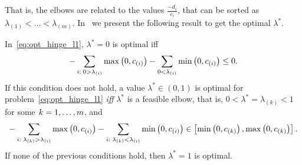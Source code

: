 That is, the elbows are related to the values $\frac{-d_i}{c_i}$, that can be sorted as ${\lambda}_{(1)} < \ldots < {\lambda}_{(m)}$.
In~\citet[Proposition 2]{RuizAD21} we present the following result to get the optimal $\lambda^*$.
\begin{proposition}\label{prop:hinge_neurocom2020}
    In~\eqref{eq:opt_hinge_l1}, $\lambda^*=0$ is optimal iff
    \begin{equation}
        \nonumber
        -\sum_{i:\; 0 > \lambda_{(i)}} \max\left(0, c_{(i)}\right) - \sum_{0 < \lambda_{(i)}} \min\left(0, c_{(i)}\right) \leq 0 .
        \end{equation}
        If this condition does not hold, a value $\lambda^* \in (0, 1)$ is optimal for problem~\eqref{eq:opt_hinge_l1} \emph{iff} $\lambda^*$ is a feasible elbow, that is, $0 < \lambda^* = \lambda_{(k)} < 1$ for some $k=1, \dotsc, m$, and
    \begin{equation}
        \label{eq:sol_hinge}
        -\sum_{i:\; \lambda_{(k)} > \lambda_{(i)}} \mymax{0, c_{(i)}} - \sum_{i:\; \lambda_{(k)} <\lambda_{(i)}} \mymin{0, c_{(i)}} \in \left[\mymin{0, c_{(k)}}, \mymax{0, c_{(k)}} \right] .
    \end{equation}
    If none of the previous conditions hold, then $\lambda^*=1$ is optimal.
\end{proposition}
